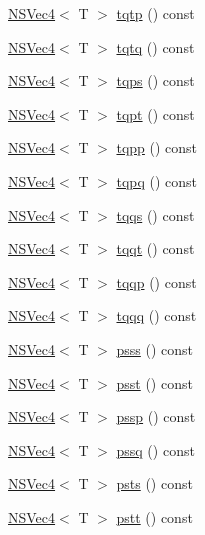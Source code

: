 \begin{DoxyCompactItemize}
\item 
\hyperlink{structNSVec4}{N\-S\-Vec4}$<$ T $>$ \hyperlink{structNSVec4_abde9bf3e4b1e59a993d55a6ba428f6b9}{tqtp} () const 
\item 
\hyperlink{structNSVec4}{N\-S\-Vec4}$<$ T $>$ \hyperlink{structNSVec4_aa4be9effe1bf5fc375a594b78ad1bff3}{tqtq} () const 
\item 
\hyperlink{structNSVec4}{N\-S\-Vec4}$<$ T $>$ \hyperlink{structNSVec4_aa11fa1dc4129cbb066238f4010864d4b}{tqps} () const 
\item 
\hyperlink{structNSVec4}{N\-S\-Vec4}$<$ T $>$ \hyperlink{structNSVec4_a22ab0e4ee06dd2f1995bcc04bc039e14}{tqpt} () const 
\item 
\hyperlink{structNSVec4}{N\-S\-Vec4}$<$ T $>$ \hyperlink{structNSVec4_a3c2cc33e24695915a111824c5aa0f392}{tqpp} () const 
\item 
\hyperlink{structNSVec4}{N\-S\-Vec4}$<$ T $>$ \hyperlink{structNSVec4_a9e4698ac3d98fac540348b9e7a4a3160}{tqpq} () const 
\item 
\hyperlink{structNSVec4}{N\-S\-Vec4}$<$ T $>$ \hyperlink{structNSVec4_a25ed8f7066996fa1344917f99791e862}{tqqs} () const 
\item 
\hyperlink{structNSVec4}{N\-S\-Vec4}$<$ T $>$ \hyperlink{structNSVec4_a9ea6086b2cc0c73f38c8916394bfcef3}{tqqt} () const 
\item 
\hyperlink{structNSVec4}{N\-S\-Vec4}$<$ T $>$ \hyperlink{structNSVec4_aab53686a1d71f2cb678c44f81bc717ce}{tqqp} () const 
\item 
\hyperlink{structNSVec4}{N\-S\-Vec4}$<$ T $>$ \hyperlink{structNSVec4_a3b3855737608cd9ac58a4d22a00f57a1}{tqqq} () const 
\item 
\hyperlink{structNSVec4}{N\-S\-Vec4}$<$ T $>$ \hyperlink{structNSVec4_ad75e73faa3bd82a50f64ac0d87b21507}{psss} () const 
\item 
\hyperlink{structNSVec4}{N\-S\-Vec4}$<$ T $>$ \hyperlink{structNSVec4_aed05f09db2b79f4750ad7ef012eff49f}{psst} () const 
\item 
\hyperlink{structNSVec4}{N\-S\-Vec4}$<$ T $>$ \hyperlink{structNSVec4_a3f2938051b7c35cde8f20b70daf9ae18}{pssp} () const 
\item 
\hyperlink{structNSVec4}{N\-S\-Vec4}$<$ T $>$ \hyperlink{structNSVec4_a87152a3a3a3340251e013b7c059f4f9b}{pssq} () const 
\item 
\hyperlink{structNSVec4}{N\-S\-Vec4}$<$ T $>$ \hyperlink{structNSVec4_acdadc24c57d5ae370c456bbd172ef392}{psts} () const 
\item 
\hyperlink{structNSVec4}{N\-S\-Vec4}$<$ T $>$ \hyperlink{structNSVec4_ada7f455c2ff8fe69f42bb5be14e6a514}{pstt} () const 

\end{DoxyCompactItemize}
